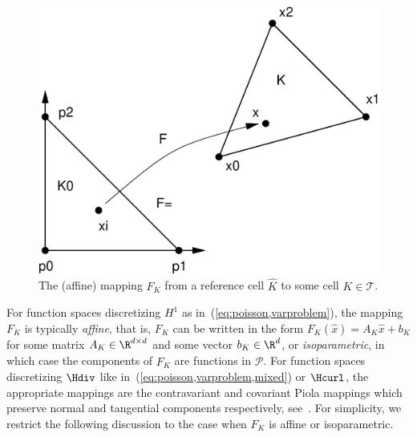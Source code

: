 \begin{figure}[htbp]
  \begin{center}
    \includegraphics[width=\largewidth]{chapters/kirby-7/eps/affinemap.eps}
    \caption{The (affine) mapping $F_K$ from a reference cell $\hat{K}$
      to some cell $K \in \mathcal{T}$.}
    \label{fig:affinemap}
  \end{center}
\end{figure}

For function spaces discretizing $H^1$ as
in~(\ref{eq:poisson,varproblem}), the mapping $F_K$ is typically
\emph{affine}, that is, $F_K$ can be written in the form $F_K(\hat{x})
= A_K \hat{x} + b_K$ for some matrix $A_K \in \R^{d\times d}$ and some
vector $b_K \in \R^d$, or \emph{isoparametric}, in which case the
components of $F_K$ are functions in $\hat{\mathcal{P}}$. For function
spaces discretizing $\Hdiv$ like
in~(\ref{eq:poisson,varproblem,mixed}) or $\Hcurl$, the appropriate
mappings are the contravariant and covariant Piola mappings which
preserve normal and tangential components respectively,
see~\cite{RognesKirbyEtAl2008}. For simplicity, we restrict the
following discussion to the case when $F_K$ is affine or
isoparametric.

